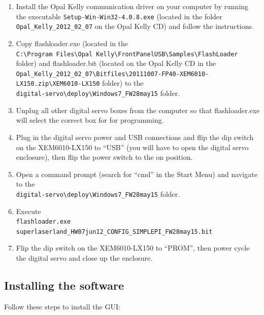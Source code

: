\documentclass[aip,rsi,preprint,graphicx]{revtex4-1}
\begin{document}
\begin{enumerate}
\item Install the Opal Kelly communication driver on your computer by running the executable {\tt Setup-Win-Win32-4.0.8.exe} (located in the folder {\tt Opal\_Kelly\_2012\_02\_07} on the Opal Kelly CD) and follow the instructions.
\item Copy flashloader.exe (located in the \\{\tt C:\textbackslash Program~Files\textbackslash Opal~Kelly\textbackslash FrontPanelUSB\textbackslash Samples\textbackslash FlashLoader} folder) and flashloader.bit (located on the Opal Kelly CD in the \\{\tt Opal\_Kelly\_2012\_02\_07\textbackslash Bitfiles\textbackslash 20111007-FP40-XEM6010-LX150.zip\textbackslash XEM6010-LX150} folder) to the \\{\tt digital-servo\textbackslash deploy\textbackslash Windows7\_FW28may15} folder.  
\item Unplug all other digital servo boxes from the computer so that flashloader.exe will select the correct box for for programming.
\item Plug in the digital servo power and USB connections and flip the dip switch on the XEM6010-LX150 to ``USB'' (you will have to open the digital servo enclosure), then flip the power switch to the on position.
\item Open a command prompt (search for ``cmd'' in the Start Menu) and navigate to the \\{\tt digital-servo\textbackslash deploy\textbackslash Windows7\_FW28may15} folder.
\item Execute \\{\tt flashloader.exe superlaserland\_HW07jun12\_CONFIG\_SIMPLEPI\_FW28may15.bit}
\item Flip the dip switch on the XEM6010-LX150 to ``PROM'', then power cycle the digital servo and close up the enclosure.
\end{enumerate}

\subsection{Installing the software}\label{sec:installSoftware}

Follow these steps to install the GUI:
\end{document}
